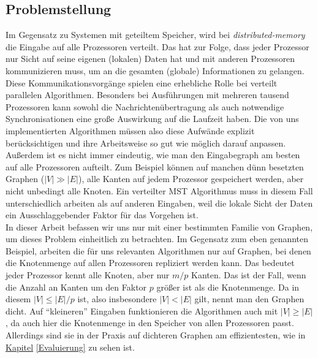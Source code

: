 \subsection{Problemstellung}
Im Gegensatz zu Systemen mit geteiltem Speicher, wird bei \emph{distributed-memory} die Eingabe auf alle Prozessoren verteilt.
Das hat zur Folge, dass jeder Prozessor nur Sicht auf seine eigenen (lokalen) Daten hat und mit anderen Prozessoren kommunizieren muss, um an die gesamten (globale) Informationen zu gelangen. Diese Kommunikationsvorgänge spielen eine erhebliche Rolle bei verteilt parallelen Algorithmen. Besonders bei Ausführungen mit mehreren tausend Prozessoren kann sowohl die Nachrichtenübertragung als auch notwendige Synchronisationen eine große Auswirkung auf die Laufzeit haben. Die von uns implementierten Algorithmen müssen also diese Aufwände explizit berücksichtigen und ihre Arbeitsweise so gut wie möglich darauf anpassen.\\
Außerdem ist es nicht immer eindeutig, wie man den Eingabegraph am besten auf alle Prozessoren aufteilt. Zum Beispiel können auf manchen dünn besetzten Graphen ($|V| \gg |E|$), alle Kanten auf jedem Prozessor gespeichert werden, aber nicht unbedingt alle Knoten. 
Ein verteilter MST Algorithmus muss in diesem Fall unterschiedlich arbeiten als auf anderen Eingaben, weil die lokale Sicht der Daten ein Ausschlaggebender Faktor für das Vorgehen ist.\\
In dieser Arbeit befassen wir uns nur mit einer bestimmten Familie von Graphen, um dieses Problem einheitlich zu betrachten. Im Gegensatz zum eben genannten Beispiel, arbeiten die für uns relevanten Algorithmen nur auf Graphen, bei denen die Knotenmenge auf allen Prozessoren repliziert werden kann. Das bedeutet jeder Prozessor kennt alle Knoten, aber nur $m/p$ Kanten. Das ist der Fall, wenn die Anzahl an Kanten um den Faktor $p$ größer ist als die Knotenmenge. Da in diesem $|V| \leq |E| / p$ ist, also insbesondere $|V| < |E|$ gilt, nennt man den Graphen dicht.
Auf \enquote{kleineren} Eingaben funktionieren die Algorithmen auch mit $|V| \geq |E|$, da auch hier die Knotenmenge in den Speicher von allen Prozessoren passt. Allerdings sind sie in der Praxis auf dichteren Graphen am effizientesten, wie in \hyperref[Evaluierung]{Kapitel} \ref{Evaluierung} zu sehen ist.

